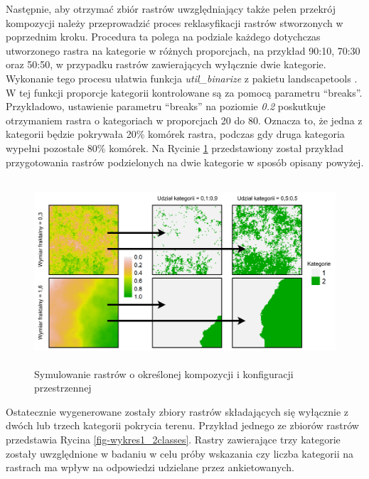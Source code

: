 \documentclass{amuthesis}
\begin{document}
Następnie, aby otrzymać zbiór rastrów uwzględniający także pełen
przekrój kompozycji należy przeprowadzić proces reklasyfikacji rastrów
stworzonych w poprzednim kroku. Procedura ta polega na podziale każdego
dotychczas utworzonego rastra na kategorie w różnych proporcjach, na
przykład 90:10, 70:30 oraz 50:50, w przypadku rastrów zawierających
wyłącznie dwie kategorie. Wykonanie tego procesu ułatwia funkcja
\emph{util\_binarize} z pakietu landscapetools \autocite{NLMR2018}. W
tej funkcji proporcje kategorii kontrolowane są za pomocą parametru
``breaks''. Przykładowo, ustawienie parametru ``breaks'' na poziomie
\emph{0.2} poskutkuje otrzymaniem rastra o kategoriach w proporcjach 20
do 80. Oznacza to, że jedna z kategorii będzie pokrywała 20\% komórek
rastra, podczas gdy druga kategoria wypełni pozostałe 80\% komórek. Na
Rycinie \ref{fig-diagram-symulowanie} przedstawiony został przykład
przygotowania rastrów podzielonych na dwie kategorie w sposób opisany
powyżej.

\begin{figure}[t]

{\centering \includegraphics[width=5.20833in,height=2.70833in]{figures/diagram_rastersim_showcase.pdf}

}

\caption{\label{fig-diagram-symulowanie}Symulowanie rastrów o określonej
kompozycji i konfiguracji przestrzennej}

\end{figure}

Ostatecznie wygenerowane zostały zbiory rastrów składających się
wyłącznie z dwóch lub trzech kategorii pokrycia terenu. Przykład jednego
ze zbiorów rastrów przedstawia Rycina \ref{fig-wykres1_2classes}. Rastry
zawierające trzy kategorie zostały uwzględnione w badaniu w celu próby
wskazania czy liczba kategorii na rastrach ma wpływ na odpowiedzi
udzielane przez ankietowanych.
\end{document}

